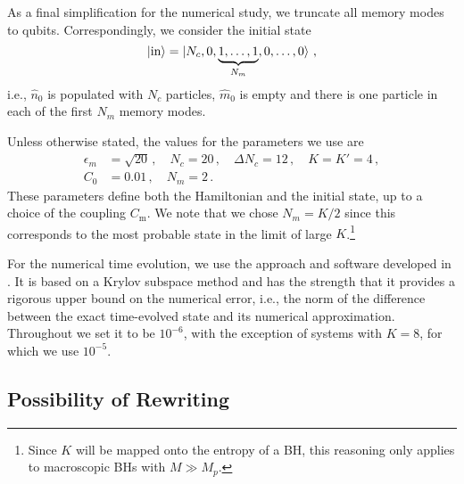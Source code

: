 \documentclass[aps,prd,reprint,superscriptaddress,nofootinbib]{revtex4-2}
\newcommand*{\ie}{i.e., }
\begin{document}
As a final simplification for the numerical study, we truncate all memory 
modes to qubits. Correspondingly, we consider the initial state
\begin{equation} \label{initialStateSimple}
	\ket{\text{in}}=\ket{N_c,0,\underbrace{1,\ldots, 1}_{N_m}, 0, \ldots, 0} \,,
\end{equation}
\ie $\hat{n}_0$ is populated with $N_c$ particles, $\hat{m}_0$ is empty and there is one particle in each of the first $N_m$ memory modes.

Unless otherwise stated, the values for the parameters we use are
\begin{align} \label{systemParameters}
	\epsilon_m &= \sqrt{20} \,, \quad N_c=20\,, \quad  \Delta N_c = 12 
\,, \quad K=K'=4 \,, 
\nonumber \\	
	 C_0 &= 0.01\,,\quad N_m=2 \,.
\end{align}
These parameters define both the Hamiltonian and the initial state, up to 
a choice of the coupling $C_{\text{m}}$.  We note that we chose $N_m = K/2$ since this corresponds to the most probable state in the limit of large $K$.\footnote{Since $K$ will be mapped onto the entropy of a BH, this 
reasoning only applies to macroscopic BHs with $M \gg M_p$.}

For the numerical time evolution, we use the approach and software developed in \cite{timeEvolver}. It is based on a Krylov subspace method and has the strength that it provides a rigorous upper bound on the numerical error, i.e., the norm of the difference between the exact time-evolved state and its numerical approximation. Throughout we set it to be $10^{-6}$, 
with the exception of systems with $K =8$, for which we use $10^{-5}$.

\subsection{Possibility of Rewriting}
\end{document}
